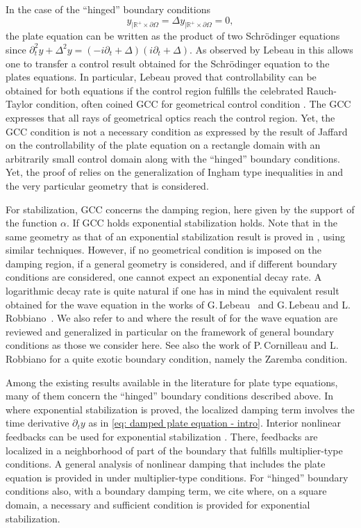 \documentclass[10pt]{amsart}
\theoremstyle{plain}
\theoremstyle{definition}
\def\R{\mathbb{R}}
\begin{document}
In the case of the ``hinged'' boundary conditions
\begin{equation*}
y_{|\R^+\times \partial\Omega}= \Delta
y_{|\R^+\times \partial\Omega}=0,
\end{equation*}
the plate equation can be written as the product of two Schrödinger
equations since
$\partial^2_t y +\Delta^2y = (-i \partial_t + \Delta) (i \partial_t + \Delta)$.
As observed by Lebeau in \cite{Lebeau:92} this allows one to transfer
a control result obtained for the Schrödinger equation to
the plates equations. In particular, Lebeau proved that controllability
can be obtained for both equations if the control region fulfills the celebrated
Rauch-Taylor condition, often coined GCC for geometrical control
condition \cite{RT:74,BLR:92}. The GCC expresses that all rays of
geometrical optics reach the control region.
Yet, the GCC condition is not a necessary condition as expressed by the result of
Jaffard~\cite{Jaffard:90} on the controllability of the plate equation on a
rectangle domain with an arbitrarily small control domain along with
the ``hinged'' boundary conditions. Yet, the proof of \cite{Jaffard:90}
relies on the generalization of Ingham type inequalities in
\cite{Kahane:62} and the very particular geometry that is considered.

For stabilization, GCC concerns the damping region, here given by the
support of the function $\alpha$. If GCC holds
exponential stabilization holds. Note that in the same geometry as that
of \cite{Jaffard:90} an exponential stabilization result is proved
in \cite{RTT:06}, using similar techniques.
However, if no geometrical condition is imposed on the damping region,
if a general geometry is considered, and if different boundary
conditions are considered,
one cannot expect an exponential decay rate. A
logarithmic decay rate is quite natural if one has in mind the
equivalent result obtained for the wave equation in the works of
G.\,Lebeau~\cite{Lebeau:96} and G.\,Lebeau and
L.\,Robbiano~\cite{LR:97}. We also refer to 
\cite[Chap.\,6]{JGL-vol1} and \cite[Chap.\,10 \& 11]{JGL-vol2} where the
result of \cite{Lebeau:96,LR:97} for the wave equation are reviewed and generalized in
particular on the framework of general boundary conditions as those we
consider here. See also the work of P.\,Cornilleau and L.\,Robbiano for
a quite exotic boundary condition, namely the Zaremba condition.

Among the existing results available in the literature for
plate type equations, many of them concern the ``hinged'' boundary
conditions described above. In \cite{RTT:06} where exponential
stabilization is proved, the localized damping term involves the time
derivative $\partial_ty$ as in \eqref{eq: damped plate equation -
intro}. Interior nonlinear feedbacks can be used for exponential
stabilization \cite{Tebou:09}. There, feedbacks are localized in a
neighborhood of part of the boundary that fulfills multiplier-type
conditions. A general analysis of nonlinear damping that includes the
plate equation is provided in \cite{AA:11} under multiplier-type
conditions. For ``hinged'' boundary conditions also, with a boundary
damping term, we cite \cite{ATT:07} where, on a square domain, a
necessary and sufficient condition is provided for exponential
stabilization.
\end{document}

